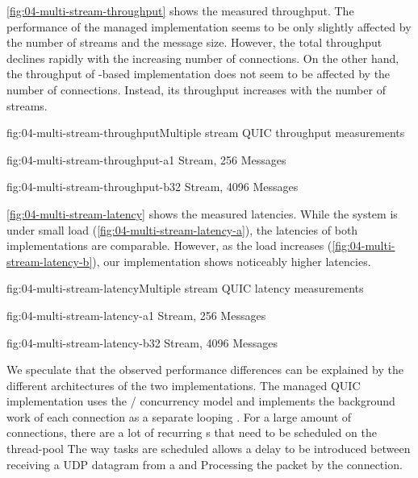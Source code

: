 \autoref{fig:04-multi-stream-throughput} shows the measured throughput. The performance of the
managed implementation seems to be only slightly affected by the number of streams and the message
size. However, the total throughput declines rapidly with the increasing number of connections. On
the other hand, the throughput of \libmsquic{}-based implementation does not seem to be affected by
the number of connections. Instead, its throughput increases with the number of streams.


\begin{myFigure}{fig:04-multi-stream-throughput}{Multiple stream QUIC throughput measurements}
\begin{mySubfigure}{0.49\linewidth}{fig:04-multi-stream-throughput-a}{1 Stream, \SI{256}{\byte} Messages}
\footnotesize

\end{mySubfigure}
\begin{mySubfigure}{0.49\linewidth}{fig:04-multi-stream-throughput-b}{32 Stream, \SI{4096}{\byte} Messages}
\footnotesize

\end{mySubfigure}
\end{myFigure}

\autoref{fig:04-multi-stream-latency} shows the measured latencies. While the system is under small
load (\autoref{fig:04-multi-stream-latency-a}), the latencies of both implementations are
comparable. However, as the load increases (\autoref{fig:04-multi-stream-latency-b}), our
implementation shows noticeably higher latencies.

\begin{myFigure}{fig:04-multi-stream-latency}{Multiple stream QUIC latency measurements}
\begin{mySubfigure}{0.49\linewidth}{fig:04-multi-stream-latency-a}{1 Stream, \SI{256}{\byte} Messages}
\footnotesize

\end{mySubfigure}
\begin{mySubfigure}{0.49\linewidth}{fig:04-multi-stream-latency-b}{32 Stream, \SI{4096}{\byte} Messages}
\footnotesize

\end{mySubfigure}
\end{myFigure}

We speculate that the observed performance differences can be explained by the different
architectures of the two implementations. The managed QUIC implementation uses the \dotnet{}
/ concurrency model and implements the background work of each
connection as a separate looping . For a large amount of connections, there are a lot of
recurring s that need to be scheduled on the \dotnet{} thread-pool The way tasks are
scheduled allows a delay to be introduced between receiving a UDP datagram from a \Socket{} and
Processing the packet by the connection.

